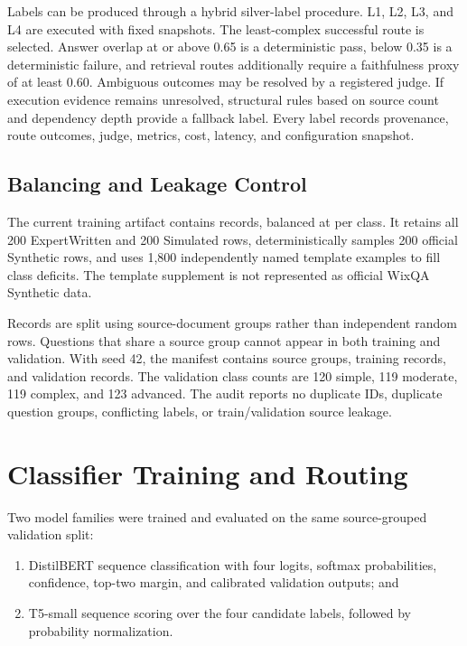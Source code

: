 Labels can be produced through a hybrid silver-label procedure. L1, L2, L3,
and L4 are executed with fixed snapshots. The least-complex successful route
is selected. Answer overlap at or above 0.65 is a deterministic pass, below
0.35 is a deterministic failure, and retrieval routes additionally require a
faithfulness proxy of at least 0.60. Ambiguous outcomes may be resolved by a
registered judge. If execution evidence remains unresolved, structural rules
based on source count and dependency depth provide a fallback label. Every
label records provenance, route outcomes, judge, metrics, cost, latency, and
configuration snapshot.

\subsection{Balancing and Leakage Control}

The current training artifact contains \PreparedDatasetRecords{} records,
balanced at \PreparedDatasetPerClass{} per class. It retains all 200
ExpertWritten and 200 Simulated rows, deterministically samples 200 official
Synthetic rows, and uses 1,800 independently named template examples to fill
class deficits. The template supplement is not represented as official WixQA
Synthetic data.



Records are split using source-document groups rather than independent random
rows. Questions that share a source group cannot appear in both training and
validation. With seed 42, the manifest contains \PreparedSourceGroups{} source
groups, \PreparedTrainRecords{} training records, and
\PreparedValidationRecords{} validation records. The validation class counts
are 120 simple, 119 moderate, 119 complex, and 123 advanced. The audit reports
no duplicate IDs, duplicate question groups, conflicting labels, or
train/validation source leakage.

\section{Classifier Training and Routing}

Two model families were trained and evaluated on the same source-grouped
validation split:

\begin{enumerate}
  \item DistilBERT sequence classification with four logits, softmax
  probabilities, confidence, top-two margin, and calibrated validation
  outputs; and
  \item T5-small sequence scoring over the four candidate labels, followed by
  probability normalization.
\end{enumerate}

